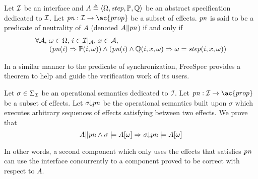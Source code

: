 \begin{definition}
  Let $\mathcal{I}$ be an interface and
  $A \triangleq \langle \Omega, \mathit{step}, \mathbb{P}, \mathbb{Q} \rangle$ be
  an abstract specification dedicated to $\mathcal{I}$. Let
  $\func{pn} : \I \rightarrow \ac{prop}$ be a subset of effects. $\mathit{pn}$
  is said to be a predicate of neutrality of $A$ (denoted
  $A \| \mathit{pn}$) if and only if \[
    \begin{array}{l}
      \forall \mathcal{A}\text{, } \omega \in \Omega\text{, } i \in
      \mathcal{I}|_{\mathcal{A}}\text{, }x \in \mathcal{A}\text{, } \\ \qquad
      (\mathit{pn}(i) \Rightarrow \mathbb{P}(i, \omega)) \wedge (\mathit{pn}(i)
      \wedge \mathbb{Q}(i, x, \omega) \Rightarrow \omega = \mathit{step}(i, x,
      \omega))
    \end{array}
  \]
\end{definition}

In a similar manner to the predicate of synchronization, FreeSpec provides a
theorem to help and guide the verification work of its users.

\begin{theorem}
  Let $\sigma \in \Sigma_{\mathcal{I}}$ be an operational semantics dedicated to
  \( \mathcal{I}\).
  Let \( \func{pn} : \I \rightarrow \ac{prop} \) be a subset of effects. Let
  \( \sigma\!\!\downarrow\!\!\mathit{pn} \) be the operational semantics built
  upon \( \sigma \) which executes arbitrary sequences of effects satisfying
   between two effects.
  We prove that
  \[
    A \| \mathit{pn} \wedge \sigma \models A[\omega] \Rightarrow
    \sigma\!\!\downarrow\!\!\mathit{pn} \models A[\omega]
  \]
\end{theorem}

In other words, a second component which only uses the effects that satisfies
$\mathit{pn}$ can use the interface concurrently to a component proved to be
correct with respect to \( A \).

